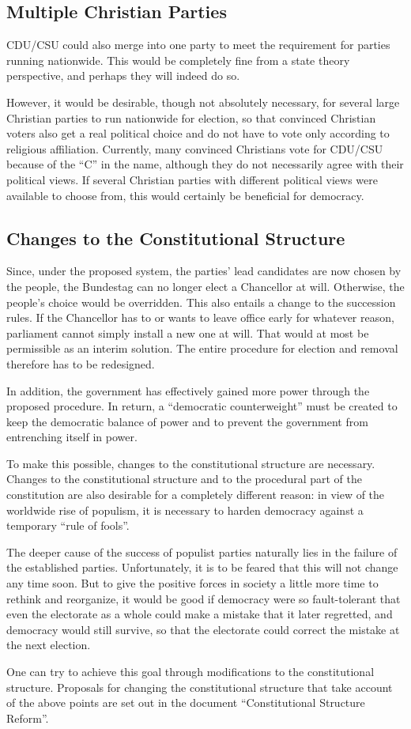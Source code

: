 \clearpage
\subsection{Multiple Christian Parties}

CDU/CSU could also merge into one party to meet the requirement for
parties running nationwide. This would be completely fine from a state theory perspective, and perhaps
they will indeed do so.

However, it would be desirable, though not absolutely necessary, for several large
Christian parties to run nationwide for election, so that convinced Christian voters also get a
real political choice and do not have to vote only according to religious affiliation. Currently,
many convinced Christians vote for CDU/CSU because of the \enquote{C} in the name, although they do not
necessarily agree with their political views. If several Christian parties with
different political views were available to choose from, this would certainly be beneficial for
democracy.

\subsection{Changes to the Constitutional Structure}

Since, under the proposed system, the parties' lead candidates are now chosen by the people, the Bundestag can no longer elect a Chancellor at will.
Otherwise, the people's choice would be overridden.
This also entails a change to the succession rules.
If the Chancellor has to or wants to leave office early for whatever reason, parliament cannot simply install a new one at will.
That would at most be permissible as an interim solution.
The entire procedure for election and removal therefore has to be redesigned.

In addition, the government has effectively gained more power through the proposed procedure.
In return, a \enquote{democratic counterweight} must be created to keep the democratic balance of power and to prevent the government from entrenching itself in power.

To make this possible, changes to the constitutional structure are necessary.
Changes to the constitutional structure and to the procedural part of the constitution are also desirable for a completely different reason: in view of the worldwide rise of populism, it is necessary to harden democracy against a temporary \enquote{rule of fools}.

The deeper cause of the success of populist parties naturally lies in the failure of the established parties.
Unfortunately, it is to be feared that this will not change any time soon.
But to give the positive forces in society a little more time to rethink and reorganize, it would be good if democracy were so fault-tolerant that even the electorate as a whole could make a mistake that it later regretted, and democracy would still survive, so that the electorate could correct the mistake at the next election.

One can try to achieve this goal through modifications to the constitutional structure.
Proposals for changing the constitutional structure that take account of the above points are set out in the document \enquote{Constitutional Structure Reform}.
